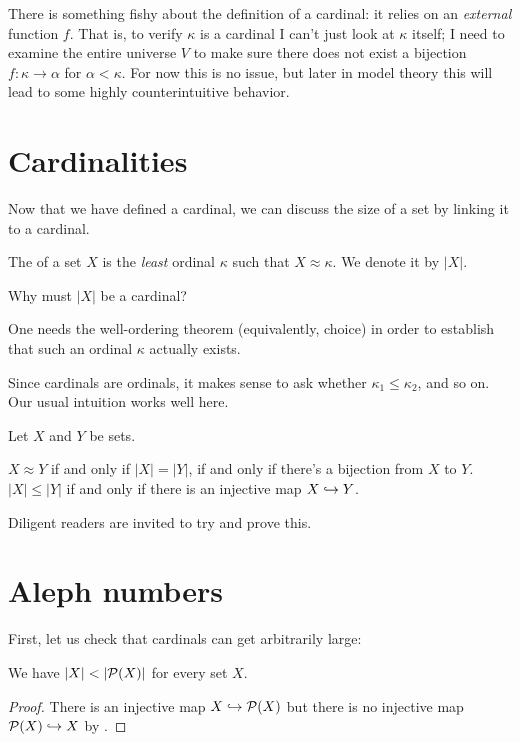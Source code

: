 \begin{remark}
	There is something fishy about the definition of a cardinal:
	it relies on an \emph{external} function $f$.
	That is, to verify $\kappa$ is a cardinal I can't just look at $\kappa$ itself;
	I need to examine the entire universe $V$ to make sure
	there does not exist a bijection $f \colon \kappa \to \alpha$ for $\alpha < \kappa$.
	For now this is no issue, but later in model theory
	this will lead to some highly counterintuitive behavior.
\end{remark}

\section{Cardinalities}
Now that we have defined a cardinal, we can discuss the size
of a set by linking it to a cardinal.

\begin{definition}
	The  of a set $X$
	is the \emph{least} ordinal $\kappa$ such that $X \approx \kappa$.
	We denote it by $\left\lvert X \right\rvert$.
\end{definition}
\begin{ques}
	Why must $\left\lvert X \right\rvert$ be a cardinal?
\end{ques}
\begin{remark}
	One needs the well-ordering theorem (equivalently, choice)
	in order to establish that such an ordinal $\kappa$ actually exists.
\end{remark}
Since cardinals are ordinals, it makes sense to ask whether $\kappa_1 \le \kappa_2$,
and so on.
Our usual intuition works well here.
\begin{proposition}
	Let $X$ and $Y$ be sets.
	\begin{enumerate}[(i)]
		\ii $X \approx Y$ if and only if $\left\lvert X \right\rvert = \left\lvert Y \right\rvert$,
		if and only if there's a bijection from $X$ to $Y$.
		\ii $\left\lvert X \right\rvert \le \left\lvert Y \right\rvert$
		if and only if there is an injective map $X \hookrightarrow Y$.
	\end{enumerate}
\end{proposition}
Diligent readers are invited to try and prove this.

\section{Aleph numbers}
First, let us check that cardinals can get arbitrarily large:
\begin{proposition}
	We have $\left\lvert X \right\rvert < \left\lvert \mathcal P(X) \right\rvert$ for every set $X$.
\end{proposition}
\begin{proof}
	There is an injective map $X \hookrightarrow \mathcal P(X)$
	but there is no injective map $\mathcal P(X) \hookrightarrow X$ by .
\end{proof}

